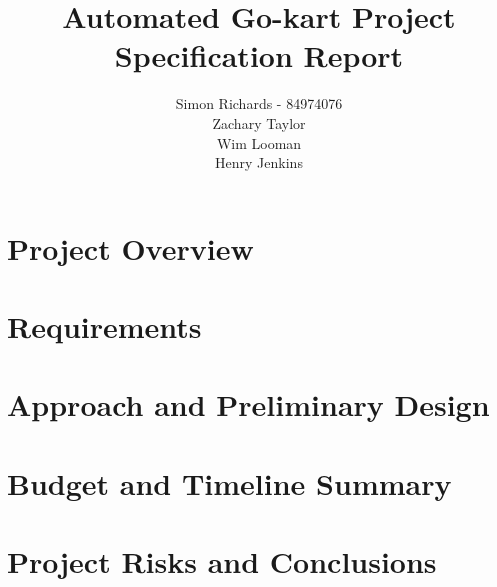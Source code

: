 \documentclass{article}
\begin{document}
\title{Automated Go-kart Project Specification Report}

\author{Simon Richards - 84974076 \\
	    Zachary Taylor  \\
	    Wim Looman  \\
	    Henry Jenkins 
}
\maketitle{}

\begin{abstract}
\end{abstract}

\section{Project Overview}

\section{Requirements}

\section{Approach and Preliminary Design}

\section{Budget and Timeline Summary}

\section{Project Risks and Conclusions}
\end{document}
